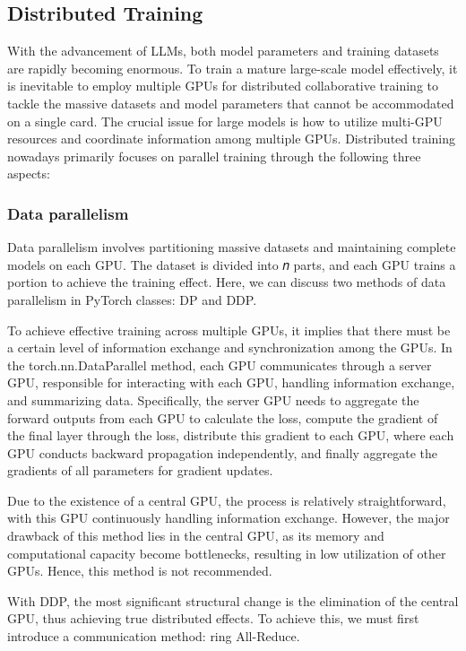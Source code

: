 \documentclass[conference]{IEEEtran}
\begin{document}
\subsection{Distributed Training}
With the advancement of LLMs, both model parameters and training datasets are rapidly becoming enormous. To train a mature large-scale model effectively, it is inevitable to employ multiple GPUs for distributed collaborative training to tackle the massive datasets and model parameters that cannot be accommodated on a single card. The crucial issue for large models is how to utilize multi-GPU resources and coordinate information among multiple GPUs. Distributed training nowadays primarily focuses on parallel training through the following three aspects:

\subsubsection{Data parallelism}
Data parallelism involves partitioning massive datasets and maintaining complete models on each GPU. The dataset is divided into 𝑛 parts, and each GPU trains a portion to achieve the training effect. Here, we can discuss two methods of data parallelism in PyTorch classes: DP and DDP.

To achieve effective training across multiple GPUs, it implies that there must be a certain level of information exchange and synchronization among the GPUs. In the torch.nn.DataParallel method, each GPU communicates through a server GPU, responsible for interacting with each GPU, handling information exchange, and summarizing data. Specifically, the server GPU needs to aggregate the forward outputs from each GPU to calculate the loss, compute the gradient of the final layer through the loss, distribute this gradient to each GPU, where each GPU conducts backward propagation independently, and finally aggregate the gradients of all parameters for gradient updates.

Due to the existence of a central GPU, the process is relatively straightforward, with this GPU continuously handling information exchange.
However, the major drawback of this method lies in the central GPU, as its memory and computational capacity become bottlenecks, resulting in low utilization of other GPUs. Hence, this method is not recommended.

With DDP, the most significant structural change is the elimination of the central GPU, thus achieving true distributed effects. To achieve this, we must first introduce a communication method: ring All-Reduce.
\end{document}
